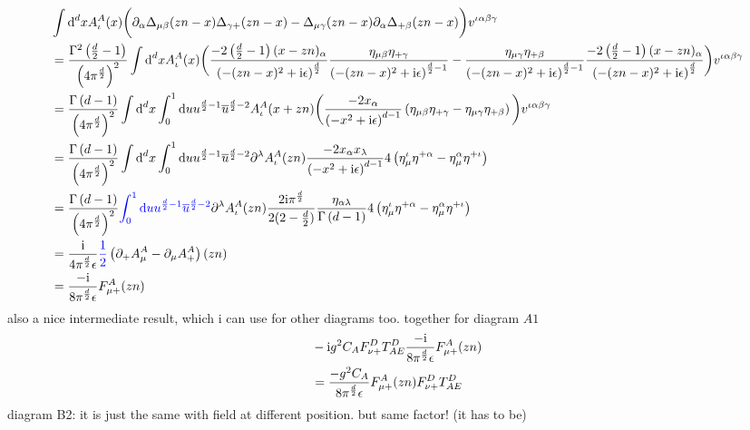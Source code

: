 \begin{align}
	&\int \text{d} ^d x A_\iota^A(x) \bigg( \partial_\alpha\Delta_{\mu \beta}(zn-x) \Delta_{\gamma +} (zn -x) - \Delta_{\mu \gamma}(zn-x) \partial_{\alpha}\Delta_{+\beta}(zn-x) \bigg) v^{\iota\alpha\beta\gamma}
	\\
	&=
	\frac{\Gamma^2\left(\frac{d}{2}-1\right)}{\left(4\pi^{\frac{d}{2}}\right)^2}\int \text{d} ^d x A_\iota^A(x) \bigg(
	\frac{-2\left(\frac{d}{2}-1\right)(x-zn)_\alpha} {\left(-(zn-x)^2+\text{i}\epsilon\right)^{\frac{d}{2}}}
	\frac{\eta_{\mu \beta}\eta_{+\gamma}} {\left(-(zn-x)^2+\text{i}\epsilon\right)^{\frac{d}{2}-1}}
	- 
	\frac{\eta_{\mu \gamma}\eta_{+\beta}} {\left(-(zn-x)^2+\text{i}\epsilon\right)^{\frac{d}{2}-1}}
	\frac{-2\left(\frac{d}{2}-1\right)(x-zn)_\alpha} {\left(-(zn-x)^2+\text{i}\epsilon\right)^{\frac{d}{2}}}
	 \bigg) v^{\iota\alpha\beta\gamma}
	\\
	&=
	\frac{\Gamma\left(d-1\right)}{\left(4\pi^{\frac{d}{2}}\right)^2}\int \text{d} ^d x \int _0^1 \text{d} u u^{\frac{d}{2}-1} \overline u^{\frac{d}{2}-2}A_\iota^A(x+zn) \bigg(
	\frac{-2 x_\alpha} {\left(-x^2+\text{i}\epsilon\right)^{d-1}}
	\left(\eta_{\mu \beta}\eta_{+\gamma}-\eta_{\mu \gamma}\eta_{+\beta} \right)
	\bigg) v^{\iota\alpha\beta\gamma}
	\\
	&=
	\frac{\Gamma\left(d-1\right)}{\left(4\pi^{\frac{d}{2}}\right)^2}\int \text{d} ^d x \int _0^1 \text{d} u u^{\frac{d}{2}-1} \overline u^{\frac{d}{2}-2} \partial^\lambda A_\iota^A(zn) \frac{-2 x_\alpha x_\lambda} {\left(-x^2+\text{i}\epsilon\right)^{d-1}}
	4\left(\eta_{\mu}^\iota \eta^{+\alpha}-\eta_{\mu}^\alpha \eta^{+\iota} \right)
	\\
	&=
	\frac{\Gamma\left(d-1\right)}{\left(4\pi^{\frac{d}{2}}\right)^2} {\color{blue}\int _0^1 \text{d} u u^{\frac{d}{2}-1} \overline u^{\frac{d}{2}-2}} \partial^\lambda A_\iota^A(zn) \frac{2\text{i} \pi^{\frac{d}{2}}}{2(2-\frac{d}{2})}\frac{\eta_{\alpha\lambda}}{\Gamma\left(d-1\right)}
	4\left(\eta_{\mu}^\iota \eta^{+\alpha}-\eta_{\mu}^\alpha \eta^{+\iota} \right)
	\\
	&=
	\frac{\text{i}}{4\pi^{\frac{d}{2}}\epsilon} {\color{blue}\frac{1}{2}} 
	\left( \partial_+ A_\mu^A - \partial_\mu A_+^A\right)(zn)
	\\
	&=
	\frac{-\text{i}}{8\pi^{\frac{d}{2}}\epsilon} 
	F_{\mu +}^A(zn)
\end{align}
also a nice intermediate result, which i can use for other diagrams too.
together for diagram $A1$
\begin{align}
	&
	-\text{i} g^2 C_A F_{\nu +} ^D T^D_{AE} \frac{-\text{i}}{8\pi^{\frac{d}{2}}\epsilon} 
	F_{\mu +}^A(zn)
	\\
	&= \frac{- g^2 C_A }{8\pi^{\frac{d}{2}}\epsilon}F_{\mu +}^A(zn)F_{\nu +} ^D T^D_{AE}	
\end{align}
diagram B2: it is just the same with field at different position. but same factor! (it has to be)

